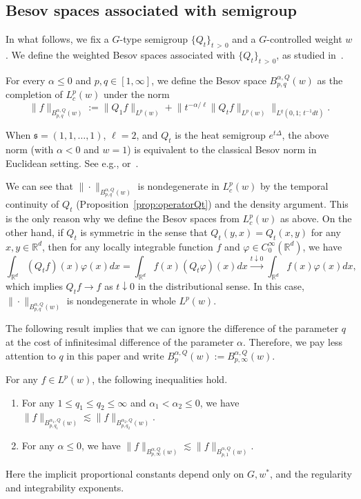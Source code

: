 \documentclass[AHL,Unicode,longabstracts,published]{cedram}
\newcommand{\bbR}{\mathbb{R}}
\newcommand{\mfs}{\mathfrak{s}}
\newcommand{\wco}{w^*}
\begin{document}
\subsection{Besov spaces associated with semigroup}

In what follows, we fix a $G$-type semigroup $\{Q_t\}_{t\,>\,0}$ and a $G$-controlled weight $w$. We define the weighted Besov spaces associated with $\{Q_t\}_{t\,>\,0}$, as studied in~\cite{BB16,BDY12, GL15}.

\begin{defi}
For every $\alpha\le0$ and $p,q\in[1,\infty]$, we define the Besov space $B_{p,q}^{\alpha,Q}(w)$ as the completion of $L_c^p(w)$ under the norm
\[
\|f\|_{B_{p,q}^{\alpha,Q}(w)}:=\|Q_1f\|_{L^p(w)}+\big\|t^{-\alpha/\ell}\|Q_t f\|_{L^p(w)}\big\|_{L^q\left(0,1;\,t^{-1}dt\right)}.
\]
\end{defi}

When $\mfs=(1,1,\dots,1)$, $\ell=2$, and $Q_t$ is the heat semigroup $e^{t\Delta}$, the above norm (with $\alpha<0$ and $w=1$) is equivalent to the classical Besov norm in Euclidean setting. See e.g., \cite[Theorem~2.34]{BCD11} or~\cite[Theorem~2.6.4]{Tri92}.

\begin{rema}\label{QtsymmetricS'}
We can see that $\|\cdot\|_{B_{p,q}^{\alpha,Q}(w)}$ is nondegenerate in $L_c^p(w)$ by the temporal continuity of $Q_t$ (Proposition~\ref{prop:operatorQt}) and the density argument. This is the only reason why we define the Besov spaces from $L_c^p(w)$ as above. On the other hand, if $Q_t$ is symmetric in the sense that $Q_t(y,x)=Q_t(x,y)$ for any $x,y\in\bbR^d$, then for any locally integrable function $f$ and $\varphi\in C_0^\infty(\bbR^d)$, we have
\[
\int_{\bbR^d}(Q_tf)(x)\varphi(x)dx=\int_{\bbR^d}f(x)(Q_t\varphi)(x)dx\xrightarrow{t\downarrow0} \int_{\bbR^d}f(x)\varphi(x)dx,
\]
which implies $Q_tf\to f$ as $t\downarrow0$ in the distributional sense. In this case, $\|\cdot\|_{B_{p,q}^{\alpha,Q}(w)}$ is nondegenerate in whole $L^p(w)$.
\end{rema}

The following result implies that we can ignore the difference of the parameter $q$ at the cost of infinitesimal difference of the parameter $\alpha$. Therefore, we pay less attention to $q$ in this paper and write $B_p^{\alpha,Q}(w):=B_{p,\infty}^{\alpha,Q}(w)$.

\begin{prop}\label{prop:almostequiv}
For any $f\in L^p(w)$, the following inequalities hold.
\begin{enumerate}
\item\label{almostequiv2}
For any $1\le q_1\le q_2\le\infty$ and $\alpha_1<\alpha_2\le0$, we have $\|f\|_{B_{p,q_1}^{\alpha_1,Q}(w)}\lesssim\|f\|_{B_{p,q_2}^{\alpha_2,Q}(w)}$.
\item\label{almostequiv3}
For any $\alpha\le0$, we have $\|f\|_{B_{p,\infty}^{\alpha,Q}(w)}\lesssim\|f\|_{B_{p,1}^{\alpha,Q}(w)}$.
\end{enumerate}
Here the implicit proportional constants depend only on $G,\wco$, and the regularity and integrability exponents.
\end{prop}
\end{document}
